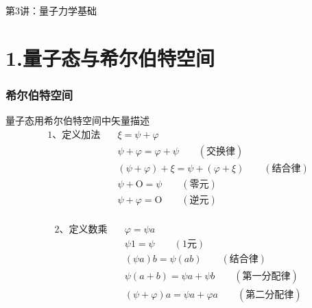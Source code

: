 

\begin{frame} [plain]
    \frametitle{}
    \Background[1] 
    \begin{center}
    {\huge 第3讲：量子力学基础}
    \end{center}  
    \addtocounter{framenumber}{-1}   
\end{frame}

\section{1.量子态与希尔伯特空间}

\begin{frame} 
    \frametitle{希尔伯特空间}
    量子态用希尔伯特空间中矢量描述\\
    \begin{equation*}
        \begin{split}
            \text{1、定义加法} \quad  &\xi=\psi+\varphi\\
            &\psi+\varphi=\varphi+\psi \qquad (\text{交换律})\\
            &(\psi+\varphi)+\xi=\psi+(\varphi+\xi) \qquad (\text{结合律})\\
            &\psi+\text{O}= \psi \qquad (\text{零元})\\
            &\psi+\varphi= \text{O} \qquad (\text{逆元})\\
        \end{split}  
    \end{equation*}
\end{frame} 

\begin{frame} 
    \begin{equation*}
        \begin{split}
            \text{2、定义数乘} \quad &\varphi=\psi a\\
            &\psi 1= \psi \qquad (\text{1元})\\
            &(\psi a)b=\psi (ab) \qquad (\text{结合律})\\
            &\psi(a+b)= \psi a+ \psi b \qquad (\text{第一分配律})\\
            &(\psi+\varphi) a= \psi a +\varphi a \qquad (\text{第二分配律})\\
        \end{split}  
    \end{equation*}
\end{frame} 

